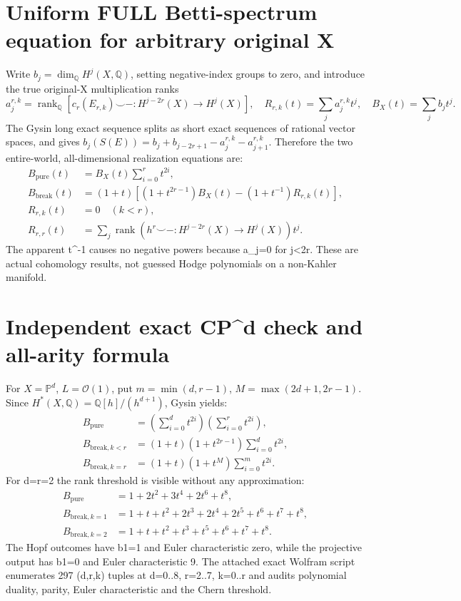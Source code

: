\documentclass[11pt]{article}
\begin{document}
\section{Uniform FULL Betti-spectrum equation for arbitrary original X}
Write $b_j=\dim_{\mathbb Q}H^j(X,\mathbb Q)$, setting negative-index
groups to zero, and introduce the true original-X multiplication ranks
\[
 a_j^{r,k}=\operatorname{rank}_{\mathbb Q}
 [c_r(E_{r,k})\smile-:H^{j-2r}(X)\to H^j(X)],\quad
 R_{r,k}(t)=\sum_j a_j^{r,k}t^j,\quad B_X(t)=\sum_j b_jt^j.
\]
The Gysin long exact sequence splits as short exact sequences of
rational vector spaces, and gives
$b_j(S(E))=b_j+b_{j-2r+1}-a_j^{r,k}-a_{j+1}^{r,k}$.
Therefore the two entire-world, all-dimensional realization equations are:
\[
 \boxed{\begin{aligned}
 B_{\mathrm{pure}}(t)
   &=B_X(t)\sum_{i=0}^rt^{2i},\\
 B_{\mathrm{break}}(t)
   &=(1+t)\left[(1+t^{2r-1})B_X(t)
        -(1+t^{-1})R_{r,k}(t)\right],\\
 R_{r,k}(t)&=0\quad(k<r),\\
 R_{r,r}(t)&=\sum_j\operatorname{rank}(h^r\smile-:
 H^{j-2r}(X)\to H^j(X))t^j .
 \end{aligned}}\tag{7}
\]
The apparent t^{-1} causes no negative powers because a_j=0
for j<2r. These are actual cohomology results, not guessed
Hodge polynomials on a non-Kahler manifold.

\section{Independent exact CP^d check and all-arity formula}
For $X=\mathbb P^d$, $L=\mathcal O(1)$, put $m=\min(d,r-1)$,
$M=\max(2d+1,2r-1)$. Since
$H^*(X,\mathbb Q)=\mathbb Q[h]/(h^{d+1})$, Gysin yields:
\[
 \boxed{\begin{aligned}
 B_{\mathrm{pure}}
 &=\left(\sum_{i=0}^d t^{2i}\right)
   \left(\sum_{i=0}^r t^{2i}\right),\\
 B_{\mathrm{break},k<r}
 &=(1+t)(1+t^{2r-1})\sum_{i=0}^d t^{2i},\\
 B_{\mathrm{break},k=r}
 &=(1+t)(1+t^M)\sum_{i=0}^{m}t^{2i}.
 \end{aligned}}\tag{8}
\]
For d=r=2 the rank threshold is visible without any approximation:
\[
 \begin{aligned}
 B_{\mathrm{pure}}&=1+2t^2+3t^4+2t^6+t^8,\\
 B_{\mathrm{break},k=1}
 &=1+t+t^2+2t^3+2t^4+2t^5+t^6+t^7+t^8,\\
 B_{\mathrm{break},k=2}
 &=1+t+t^2+t^3+t^5+t^6+t^7+t^8.
 \end{aligned}\tag{9}
\]
The Hopf outcomes have b1=1 and Euler characteristic zero,
while the projective output has b1=0 and Euler characteristic 9.
The attached exact Wolfram script enumerates 297 (d,r,k)
tuples at d=0..8, r=2..7, k=0..r and audits polynomial
duality, parity, Euler characteristic and the Chern threshold.
\end{document}
